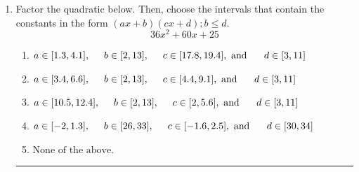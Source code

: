 \documentclass[14pt]{extbook}
\newcommand{\litem}[1]{\item#1\hspace*{-1cm}\rule{\textwidth}{0.4pt}}
\begin{document}
\begin{enumerate}
{\begin{enumerate}[label=\Alph*.]
\end{enumerate} }
\litem{
Factor the quadratic below. Then, choose the intervals that contain the constants in the form $(ax+b)(cx+d); b \leq d.$\[ 36x^{2} +60 x + 25 \]\begin{enumerate}[label=\Alph*.]
\item \( a \in [1.3, 4.1], \hspace*{5mm} b \in [2, 13], \hspace*{5mm} c \in [17.8, 19.4], \text{ and } \hspace*{5mm} d \in [3, 11] \)
\item \( a \in [3.4, 6.6], \hspace*{5mm} b \in [2, 13], \hspace*{5mm} c \in [4.4, 9.1], \text{ and } \hspace*{5mm} d \in [3, 11] \)
\item \( a \in [10.5, 12.4], \hspace*{5mm} b \in [2, 13], \hspace*{5mm} c \in [2, 5.6], \text{ and } \hspace*{5mm} d \in [3, 11] \)
\item \( a \in [-2, 1.3], \hspace*{5mm} b \in [26, 33], \hspace*{5mm} c \in [-1.6, 2.5], \text{ and } \hspace*{5mm} d \in [30, 34] \)
\item \( \text{None of the above.} \)


\end{enumerate}}
\end{enumerate}
\end{document}
